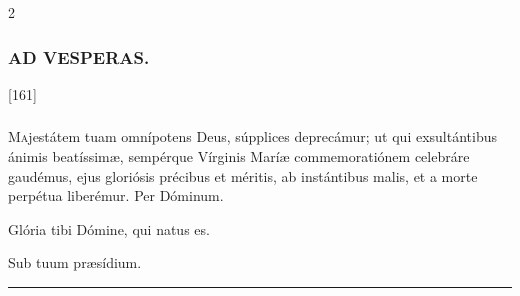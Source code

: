 \documentclass[9pt,twoside]{extarticle}
\begin{document}
\begin{multicols}{2}
\subsubsection*{\center \textsc{AD VESPERAS.}}
\begin{tightlist}{}
\item {} [161] 
\end{tightlist}


\subsubsection*{\center {}}
\lettrine{M}ajestátem tuam omnípotens Deus, súpplices deprecámur; ut qui exsultántibus ánimis beatíssimæ, sempérque Vírginis Maríæ commemoratiónem celebráre gaudémus, ejus gloriósis précibus et méritis, ab instántibus malis, et a morte perpétua liberémur. Per Dóminum.

\begin{tightlist}{}
\item {} Glória tibi Dómine, qui natus es.
\item {} Sub tuum præsídium.
\end{tightlist}

\begin{center}\textcolor{red}{\rule{\linewidth}{0.5pt}} \end{center}


\end{multicols}
\end{document}
